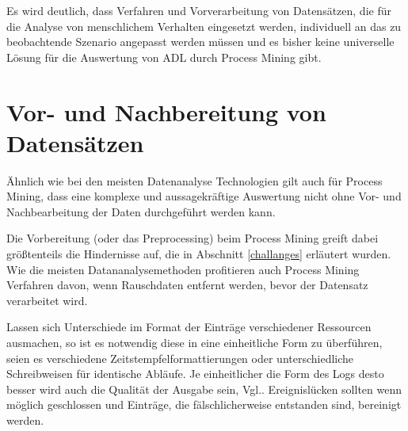 Es wird deutlich, dass Verfahren und Vorverarbeitung von Datensätzen, die für die Analyse von menschlichem Verhalten eingesetzt werden, individuell an das zu beobachtende Szenario angepasst werden müssen und es bisher keine universelle Lösung für die Auswertung von ADL durch Process Mining gibt.


\section{Vor- und Nachbereitung von Datensätzen}
Ähnlich wie bei den meisten Datenanalyse Technologien gilt auch für Process Mining, dass eine komplexe und aussagekräftige Auswertung nicht ohne Vor- und Nachbearbeitung der Daten durchgeführt werden kann.

Die Vorbereitung (oder das Preprocessing) beim Process Mining greift dabei größtenteils die Hindernisse auf, die in Abschnitt \ref{challanges} erläutert wurden. Wie die meisten Datananalysemethoden profitieren auch Process Mining Verfahren davon, wenn Rauschdaten entfernt werden, bevor der Datensatz verarbeitet wird. 

Lassen sich Unterschiede im Format der Einträge verschiedener Ressourcen ausmachen, so ist es notwendig diese in eine einheitliche Form zu überführen, seien es verschiedene Zeitstempfelformattierungen oder unterschiedliche Schreibweisen für identische Abläufe. Je einheitlicher die Form des Logs desto besser wird auch die Qualität der Ausgabe sein, Vgl.\cite{PMinAction}. Ereignislücken sollten wenn möglich geschlossen und Einträge, die fälschlicherweise entstanden sind, bereinigt werden.

